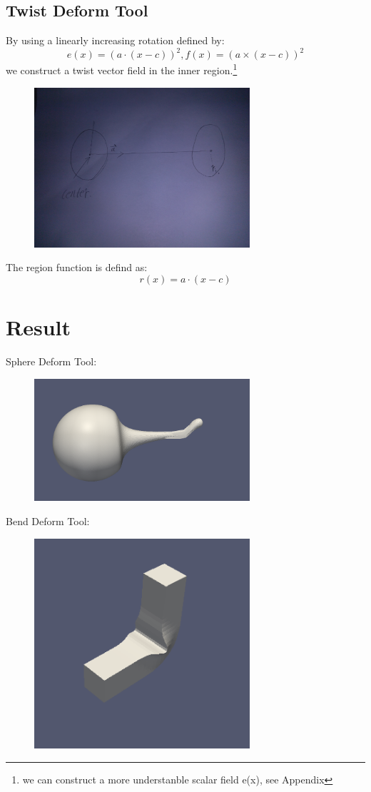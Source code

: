 \documentclass{article}
\theoremstyle{definition}
\theoremstyle{remark}
\begin{document}
\subsection{Twist Deform Tool}
By using a linearly increasing rotation defined by:
\begin{equation}
e(x) = (a \cdot (x-c) )^2,  f(x)=(a \times (x-c) )^2
\end{equation}
 we construct a twist vector field in the inner region.\footnote{\noindent we can construct a more understanble scalar field e(x), see Appendix}
 \begin{figure}[H]
\includegraphics[width=8cm]{twist}
\centering
\end{figure}
The region function is defind as:
\begin{equation}
  r(x) = a \cdot (x-c)
\end{equation}

\section{Result}
Sphere Deform Tool:
\begin{figure}[H]
\includegraphics[width=8cm]{sphere_deform_result}
\centering
\end{figure}

Bend Deform Tool:
\begin{figure}[H]
\includegraphics[width=8cm]{bend_result}
\centering
\end{figure}
\end{document}
